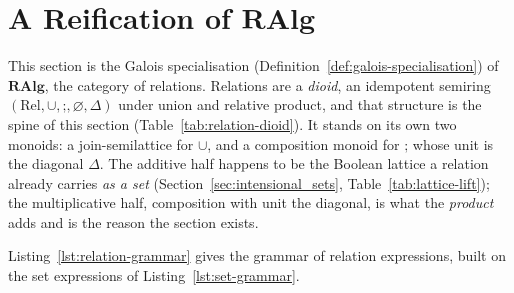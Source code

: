 \documentclass[11pt, a4paper]{article}
\begin{document}
\section{A Reification of $\mathbf{RAlg}$}
\label{sec:relations_functions_blueprint}

This section is the Galois specialisation (Definition~\ref{def:galois-specialisation}) of $\mathbf{RAlg}$, the category of relations.
Relations are a \emph{dioid}, an idempotent semiring $(\mathrm{Rel}, \cup, \mathbin{;}, \varnothing, \Delta)$ under union and relative product, and that structure is the spine of this section (Table~\ref{tab:relation-dioid}).
It stands on its own two monoids: a join-semilattice for $\cup$, and a composition monoid for $\mathbin{;}$ whose unit is the diagonal $\Delta$.
The additive half happens to be the Boolean lattice a relation already carries \emph{as a set} (Section~\ref{sec:intensional_sets}, Table~\ref{tab:lattice-lift}); the multiplicative half, composition with unit the diagonal, is what the \emph{product} adds and is the reason the section exists.

Listing~\ref{lst:relation-grammar} gives the grammar of relation expressions, built on the set expressions of Listing~\ref{lst:set-grammar}.
\end{document}
